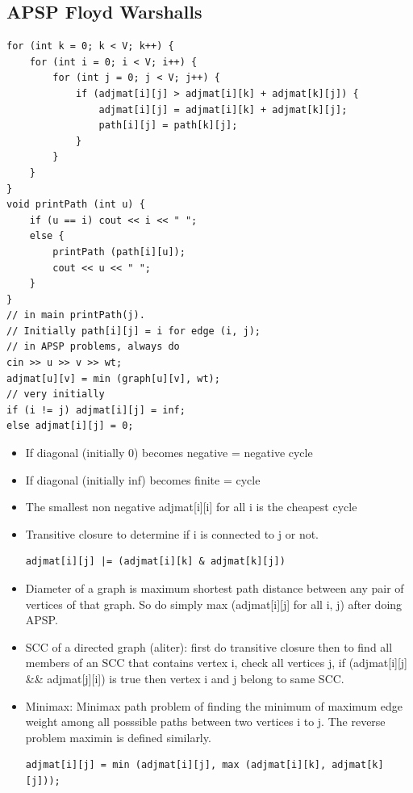 \documentclass[8pt, a4paper, oneside, twocolumn]{extarticle}
\begin{document}
\subsection{APSP Floyd Warshalls}
\begin{verbatim}
for (int k = 0; k < V; k++) {
    for (int i = 0; i < V; i++) {
        for (int j = 0; j < V; j++) {
            if (adjmat[i][j] > adjmat[i][k] + adjmat[k][j]) {
                adjmat[i][j] = adjmat[i][k] + adjmat[k][j];
                path[i][j] = path[k][j];
            }
        }
    }
}
void printPath (int u) {
    if (u == i) cout << i << " ";
    else {
        printPath (path[i][u]);
        cout << u << " ";
    }
}
// in main printPath(j).
// Initially path[i][j] = i for edge (i, j);
// in APSP problems, always do 
cin >> u >> v >> wt;
adjmat[u][v] = min (graph[u][v], wt);
// very initially
if (i != j) adjmat[i][j] = inf;
else adjmat[i][j] = 0;
\end{verbatim}
\begin{itemize}
    \item If diagonal (initially 0) becomes negative = negative cycle
    \item If diagonal (initially inf) becomes finite = cycle
    \item The smallest non negative adjmat[i][i] for all i is the cheapest cycle
    \item Transitive closure to determine if i is connected to j or not.
    \begin{verbatim}
adjmat[i][j] |= (adjmat[i][k] & adjmat[k][j])
    \end{verbatim}
    \item Diameter of a graph is maximum shortest path distance between any pair of vertices of that graph. So do simply max (adjmat[i][j] for all i, j) after doing APSP.
    \item SCC of a directed graph (aliter): first do transitive closure then to find all members of an SCC that contains vertex i, check all vertices j, if (adjmat[i][j] \&\& adjmat[j][i]) is true then vertex i and j belong to same SCC.
    \item Minimax: Minimax path problem of finding the minimum of maximum edge weight among all posssible paths between two vertices i to j. The reverse problem maximin is defined similarly.
    \begin{verbatim}
adjmat[i][j] = min (adjmat[i][j], max (adjmat[i][k], adjmat[k][j]));
    \end{verbatim}
\end{itemize}
\end{document}
